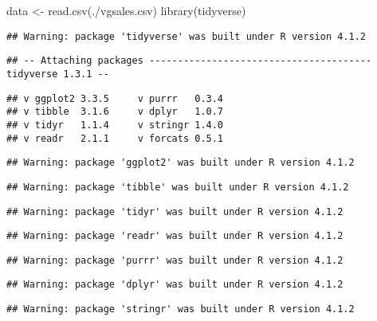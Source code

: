 \documentclass[
]{article}
\author{}
\date{\vspace{-2.5em}}
\newenvironment{Shaded}{\begin{snugshade}}{\end{snugshade}}
\newcommand{\FunctionTok}[1]{\textcolor[rgb]{0.00,0.00,0.00}{#1}}
\newcommand{\NormalTok}[1]{#1}
\newcommand{\OtherTok}[1]{\textcolor[rgb]{0.56,0.35,0.01}{#1}}
\newcommand{\StringTok}[1]{\textcolor[rgb]{0.31,0.60,0.02}{#1}}
\begin{document}
\begin{Shaded}
\begin{Highlighting}[]
\NormalTok{data }\OtherTok{\textless{}{-}} \FunctionTok{read.csv}\NormalTok{(}\StringTok{\textquotesingle{}./vgsales.csv\textquotesingle{}}\NormalTok{)}
\FunctionTok{library}\NormalTok{(tidyverse)}
\end{Highlighting}
\end{Shaded}

\begin{verbatim}
## Warning: package 'tidyverse' was built under R version 4.1.2
\end{verbatim}

\begin{verbatim}
## -- Attaching packages --------------------------------------- tidyverse 1.3.1 --
\end{verbatim}

\begin{verbatim}
## v ggplot2 3.3.5     v purrr   0.3.4
## v tibble  3.1.6     v dplyr   1.0.7
## v tidyr   1.1.4     v stringr 1.4.0
## v readr   2.1.1     v forcats 0.5.1
\end{verbatim}

\begin{verbatim}
## Warning: package 'ggplot2' was built under R version 4.1.2
\end{verbatim}

\begin{verbatim}
## Warning: package 'tibble' was built under R version 4.1.2
\end{verbatim}

\begin{verbatim}
## Warning: package 'tidyr' was built under R version 4.1.2
\end{verbatim}

\begin{verbatim}
## Warning: package 'readr' was built under R version 4.1.2
\end{verbatim}

\begin{verbatim}
## Warning: package 'purrr' was built under R version 4.1.2
\end{verbatim}

\begin{verbatim}
## Warning: package 'dplyr' was built under R version 4.1.2
\end{verbatim}

\begin{verbatim}
## Warning: package 'stringr' was built under R version 4.1.2
\end{verbatim}
\end{document}

